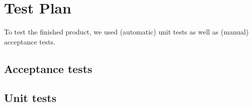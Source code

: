 \chapter{Test Plan}

To test the finished product, we used (automatic) unit tests as well as (manual) acceptance tests.

\section{Acceptance tests}

\section{Unit tests}
